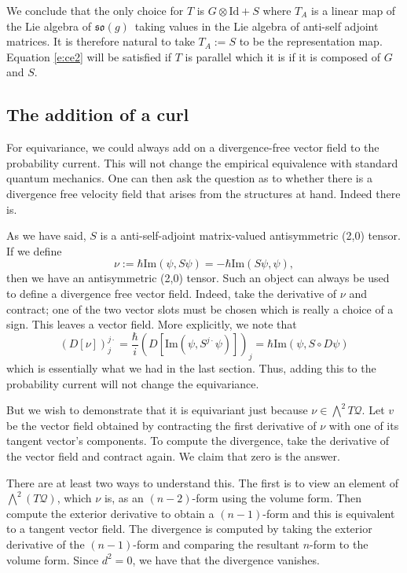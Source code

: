 \documentclass[11pt]{article}
\theoremstyle{remark}
\begin{document}
We conclude that the only choice for $T$ is $G \otimes
\ensuremath{\text{Id}} +S$ where $T_A$ is a linear map of the Lie algebra of
\ensuremath{\mathfrak{so}(g)}\ taking values in the Lie algebra of anti-self adjoint
matrices. It is therefore natural to take $T_A \ensuremath{:=} S$ 
to be the representation
map.  Equation \eqref{e:ce2} will be satisfied if $T$ is
parallel which it is if it is composed of $G$ and $S$.


\subsection{The addition of a curl}

For equivariance, we could always add on a divergence-free vector
field to the probability current. 
This will not change the empirical equivalence with standard
quantum mechanics. One can then ask the question as to
whether there is a divergence free velocity field that arises from the
structures at hand. Indeed there is. 

As we have said, $S$ is a anti-self-adjoint matrix-valued 
antisymmetric (2,0) tensor. If we define
\[ \nu \ensuremath{:=} 
\ensuremath{\hbar} \textrm{Im} \ensuremath{({\ensuremath{\psi}}, {S \ensuremath{\psi}})} = -\ensuremath{\hbar} \textrm{Im} \ensuremath{({S\ensuremath{\psi}}, { \ensuremath{\psi}})},
\] 
then we have an antisymmetric (2,0) tensor. 
Such an object can always be used to define a divergence free vector
field. Indeed, take the derivative of $\nu$ and contract; one of the
two vector slots must be chosen which is really a choice of a sign. 
This leaves a vector field.  More explicitly, we note that 
\[
(D [\nu])^{\ensuremath{j}\cdot}_{\ensuremath{j}} 
=    \frac{\ensuremath{\hbar}}{i} (D [\textrm{Im} \ensuremath{({\ensuremath{\psi}}, {S^{\ensuremath{j} \cdot} \ensuremath{\psi}})}])_{\ensuremath{j}}
= \ensuremath{\hbar} \textrm{Im} \ensuremath{({\ensuremath{\psi}}, {S \circ D \ensuremath{\psi}})}
\]
which is essentially what we had in the last section. Thus, adding this to
the probability current will not change the equivariance. 

But we wish to demonstrate that it is equivariant just because $\nu
\in \bigwedge^2 \ensuremath{T \ensuremath{\mathcal{Q}}}$. Let $v$ be the vector field obtained by
contracting the first derivative of $\nu$ with one of its tangent
vector's components. 
To compute the divergence, take the
derivative of the vector field and contract again. We claim that zero
is the answer. 

There are at least two ways to understand this. The first is to view an element
of $\bigwedge^2 (\ensuremath{T \ensuremath{\mathcal{Q}}})$, which $\nu$ is, as an $(n-2)$-form using the
volume form. Then
compute the exterior derivative  to obtain a $(n-1)$-form and this is
equivalent to a tangent vector field. The divergence is computed by
taking the exterior derivative of the $(n-1)$-form and comparing the
resultant $n$-form to the volume form. Since $d^2 =0$, we have that
the divergence vanishes.
\end{document}
